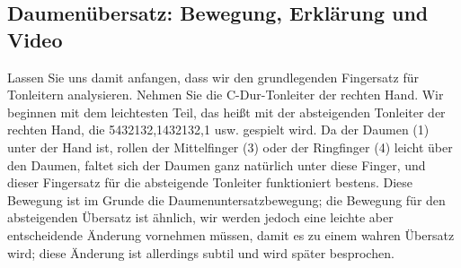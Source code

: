 \subsection{Daumenübersatz: Bewegung, Erklärung und Video}
\label{c1iii5b}

Lassen Sie uns damit anfangen, dass wir den grundlegenden Fingersatz für Tonleitern analysieren.
Nehmen Sie die C-Dur-Tonleiter der rechten Hand.
Wir beginnen mit dem leichtesten Teil, das heißt mit der absteigenden Tonleiter der rechten Hand, die 5432132,1432132,1 usw. gespielt wird.
Da der Daumen (1) unter der Hand ist, rollen der Mittelfinger (3) oder der Ringfinger (4) leicht über den Daumen, faltet sich der Daumen ganz natürlich unter diese Finger, und dieser Fingersatz für die absteigende Tonleiter funktioniert bestens.
Diese Bewegung ist im Grunde die Daumenuntersatzbewegung; die Bewegung für den absteigenden Übersatz ist ähnlich, wir werden jedoch eine leichte aber entscheidende Änderung vornehmen müssen, damit es zu einem wahren Übersatz wird; diese Änderung ist allerdings subtil und wird später besprochen.


